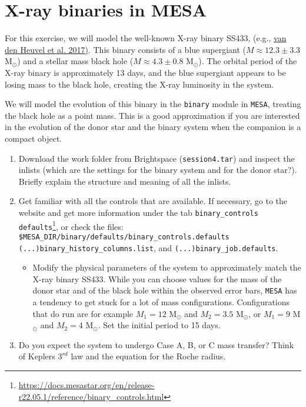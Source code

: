 \documentclass[11pt,a4paper]{article}
\begin{document}
\section{X-ray binaries in MESA}

For this exercise, we will model the well-known X-ray binary SS433, (e.g., \href{https://ui.adsabs.harvard.edu/abs/2017MNRAS.471.4256V/abstract}{van den Heuvel et al. 2017)}. This binary consists of a blue supergiant ($M \approx 12.3 \pm 3.3$ M$_\odot$) and a stellar mass black hole ($M \approx 4.3 \pm 0.8$ M$_\odot$). The orbital period of the X-ray binary is approximately 13 days, and the blue supergiant appears to be losing mass to the black hole, creating the X-ray luminosity in the system.

We will model the evolution of this binary in the \texttt{binary} module in \texttt{MESA}, treating the black hole as a point mass. This is a good approximation if you are interested in the evolution of the donor star and the binary system when the companion is a compact object. 

\begin{enumerate}[label=(\alph*)]
  \item Download the work folder from Brightspace (\verb|session4.tar|) and inspect the inlists (which are the settings for the binary system and for the donor star?). Briefly explain the structure and meaning of all the inlists. 
  
  \item Get familiar with all the controls that are available. If necessary, go to the website and get more information under the tab \verb|binary_controls defaults|\footnote{\url{https://docs.mesastar.org/en/release-r22.05.1/reference/binary_controls.html}}, or check the files: \\
   \texttt{\$MESA\_DIR/binary/defaults/binary\_controls.defaults} \\
  \texttt{(...)binary\_history\_columns.list}, and \texttt{(...)binary\_job.defaults}.
  
  \begin{itemize}    
  \item Modify the physical parameters of the system to approximately match the X-ray binary SS433. While you can choose values for the mass of the donor star and of the black hole within the observed error bars, \texttt{MESA} has a tendency to get stuck for a lot of mass configurations. Configurations that do run are for example $M_1=12$  M$_\odot$ and $M_2=3.5$  M$_\odot$, or $M_1=9$  M$_\odot$ and $M_2=4$  M$_\odot$. Set the initial period to 15 days. 
  \end{itemize}
    
  \item Do you expect the system to undergo Case A, B, or C mass transfer? Think of Keplers $3^{rd}$ law and the equation for the Roche radius. 
  

  \end{enumerate}
\end{document}
